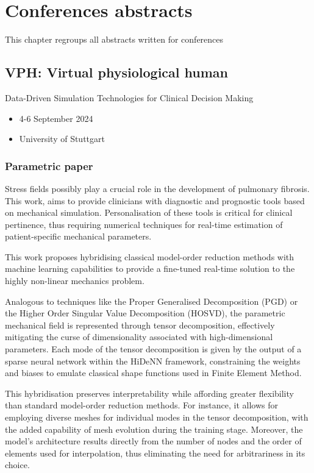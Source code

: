 \chapter[Conferences abstracts]{Conferences abstracts}
\label{chap:conf}
\begin{chapabstract}
    This chapter regroups all abstracts written for conferences
\end{chapabstract}

\minitoc

\section{VPH: Virtual physiological human}
Data-Driven Simulation Technologies for Clinical Decision Making
\begin{itemize}
    \item 4-6 September 2024
    \item University of Stuttgart
\end{itemize}

\subsection{Parametric paper}

Stress fields possibly play a crucial role in the development of pulmonary fibrosis. This work, aims to provide clinicians with diagnostic and prognostic tools based on mechanical simulation. Personalisation of these tools is critical for clinical pertinence, thus requiring numerical techniques for real-time estimation of patient-specific mechanical parameters.

This work proposes hybridising classical model-order reduction methods with machine learning capabilities to provide a fine-tuned real-time solution to the highly non-linear mechanics problem. 

Analogous to techniques like the Proper Generalised Decomposition (PGD) or the Higher Order Singular Value Decomposition (HOSVD), the parametric mechanical field is represented through tensor decomposition, effectively mitigating the curse of dimensionality associated with high-dimensional parameters. Each mode of the tensor decomposition is given by the output of a sparse neural network within the HiDeNN framework, constraining the weights and biases to emulate classical shape functions used in Finite Element Method.

This hybridisation preserves interpretability while affording greater flexibility than standard model-order reduction methods. For instance, it allows for employing diverse meshes for individual modes in the tensor decomposition, with the added capability of mesh evolution during the training stage. Moreover, the model's architecture results directly from the number of nodes and the order of elements used for interpolation, thus eliminating the need for arbitrariness in its choice.

